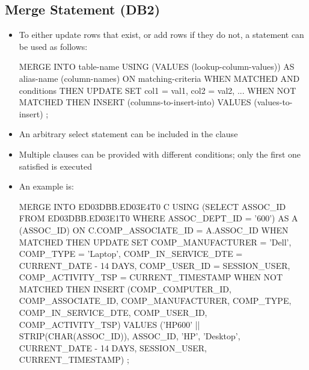 \documentclass[a4paper]{article}
\begin{document}
\subsection{Merge Statement (DB2)}
\begin{itemize}
\item To either update rows that exist, or add rows if they do not, a  statement can be used as follows:
\begin{sql}
MERGE INTO table-name
  USING (VALUES (lookup-column-values)) AS alias-name (column-names)
     ON matching-criteria
  WHEN MATCHED
    AND conditions
    THEN UPDATE SET col1 = val1,
                    col2 = val2,
                    ...
  WHEN NOT MATCHED
    THEN INSERT (columns-to-insert-into)
         VALUES (values-to-insert)
;
\end{sql}
\item An arbitrary select statement can be included in the  clause
\item Multiple  clauses can be provided with different conditions; only the first one satisfied is executed
\item An example is:
\begin{sql}
MERGE INTO ED03DBB.ED03E4T0 C
  USING (SELECT ASSOC_ID
           FROM ED03DBB.ED03E1T0
          WHERE ASSOC_DEPT_ID = '600') AS A (ASSOC_ID)
    ON C.COMP_ASSOCIATE_ID = A.ASSOC_ID
  WHEN MATCHED
    THEN UPDATE SET COMP_MANUFACTURER = 'Dell',
                    COMP_TYPE = 'Laptop',
                    COMP_IN_SERVICE_DTE = CURRENT_DATE - 14 DAYS,
                    COMP_USER_ID = SESSION_USER,
                    COMP_ACTIVITY_TSP = CURRENT_TIMESTAMP
  WHEN NOT MATCHED
    THEN INSERT (COMP_COMPUTER_ID,
                 COMP_ASSOCIATE_ID,
                 COMP_MANUFACTURER,
                 COMP_TYPE,
                 COMP_IN_SERVICE_DTE,
                 COMP_USER_ID,
                 COMP_ACTIVITY_TSP)
         VALUES ('HP600' || STRIP(CHAR(ASSOC_ID)),
                 ASSOC_ID,
                 'HP',
                 'Desktop',
                 CURRENT_DATE - 14 DAYS,
                 SESSION_USER,
                 CURRENT_TIMESTAMP)
;
\end{sql}
\end{itemize}
\end{document}
